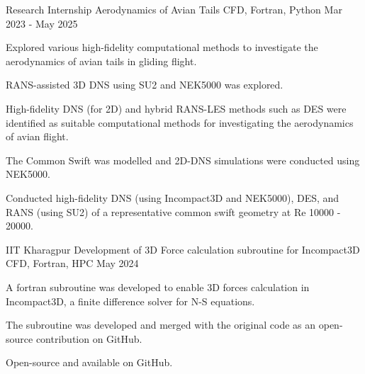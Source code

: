 
\begin{cventries}
  \cventry
  {Research Internship} %
  {Aerodynamics of Avian Tails} %
  {CFD, Fortran, Python} %
  {Mar 2023 - May 2025} %
  {
    \begin{cvitems} %
       \item {Explored various high-fidelity computational methods to investigate the aerodynamics of avian tails in gliding flight.}
      \item {RANS-assisted 3D DNS using SU2 and NEK5000 was explored.}
      \item {High-fidelity DNS (for 2D) and hybrid RANS-LES methods such as DES were identified as suitable computational methods for investigating the aerodynamics of avian flight.}
      \item {The Common Swift was modelled and 2D-DNS simulations were conducted using NEK5000.}
      \item {Conducted high-fidelity DNS (using Incompact3D and NEK5000), DES, and RANS (using SU2) of a representative common swift geometry at Re 10000 - 20000.}
    \end{cvitems}
  }
 
  \cventry
  {IIT Kharagpur} %
  {Development of 3D Force calculation subroutine for Incompact3D} %
  {CFD, Fortran, HPC} %
  {May 2024} %
  {
    \begin{cvitems} %
      \item {A fortran subroutine was developed to enable 3D forces calculation in Incompact3D, a finite difference solver for N-S equations.}
      \item {The subroutine was developed and merged with the original code as an open-source contribution on GitHub.}
      \item {Open-source and available on GitHub.}
    \end{cvitems}
  }


\end{cventries}
